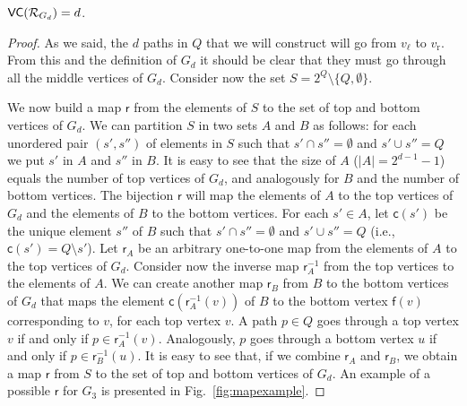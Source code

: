 \begin{lemma}\label{lem:vcdimlowbound}
  $\mathsf{VC}(\mathcal{R}_{G_d})=d$.
\end{lemma}
\ifproof
\begin{proof}
  As we said, the $d$ paths in $Q$ that we will construct will go from $v_\ell$ to $v_\mathrm{r}$.
  From this and the definition of $G_d$ it should be clear that they must go through
  all the middle vertices of $G_d$. Consider now the set
  $S=2^Q\setminus\{Q,\emptyset\}$.
  
  We now build a map $\mathsf{r}$
  from the elements of $S$ to the set of top and bottom vertices of $G_d$. We can
  partition $S$ in two sets $A$ and $B$ as follows: %
  for each unordered pair $(s',s'')$ of
  elements in $S$ such that $s'\cap s''=\emptyset$ and $s'\cup s''=Q$
  we put $s'$ in $A$ and $s''$ in $B$. It is
  easy to see that the size of $A$ ($|A|=2^{d-1}-1$) equals the number of top
  vertices of $G_d$, and analogously for $B$ and the number of bottom vertices.
  The bijection $\mathsf{r}$ will map the
  elements of $A$ to the top vertices of $G_d$ and the elements of $B$ to the
  bottom vertices. For each $s'\in A$, let $\mathsf{c}(s')$ be the unique element $s''$
  of $B$ such that $s'\cap s''=\emptyset$ and $s'\cup s''=Q$ (i.e.,
  $\mathsf{c}(s')=Q\setminus s'$). 
  Let $\mathsf{r}_A$ be an arbitrary one-to-one map from the elements of $A$ to
  the top vertices of $G_d$. Consider now the inverse map $\mathsf{r}^{-1}_A$
  from the top vertices to the elements of $A$. We can create another map
  $\mathsf{r}_B$ from $B$ to the
  bottom vertices of $G_d$ that maps the element
  $\mathsf{c}(\mathsf{r}^{-1}_A(v))$ of $B$ to the bottom vertex $\mathsf{f}(v)$
  corresponding to $v$, for each top vertex $v$. A path $p\in Q$ goes through
  a top vertex $v$ if and only if $p\in\mathsf{r}^{-1}_A(v)$. Analogously, $p$
  goes through a bottom vertex $u$ if and only if $p\in\mathsf{r}^{-1}_B(u)$.
  It is easy to see that, if we combine $\mathsf{r}_A$ and
  $\mathsf{r}_B$, we obtain a map $\mathsf{r}$ from $S$ to the set of
  top and bottom vertices of $G_d$. An example of a possible $\mathsf{r}$ for
  $G_3$ is presented in Fig.~\ref{fig:mapexample}.


\end{proof}
